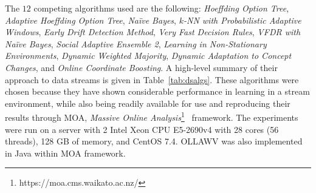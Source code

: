 \documentclass[reqno]{vcuthesis}
\numberwithin{equation}{chapter}
\begin{document}
The $12$ competing algorithms used are the following: \textit{Hoeffding Option Tree}, \textit{Adaptive Hoeffding Option Tree}, \textit{Na\"{i}ve Bayes}, \textit{$k$-NN with Probabilistic Adaptive Windows}, \textit{Early Drift Detection Method}, \textit{Very Fast Decision Rules}, \textit{VFDR with Na\"{i}ve Bayes}, \textit{Social Adaptive Ensemble 2}, \textit{Learning in Non-Stationary Environments}, \textit{Dynamic Weighted Majority}, \textit{Dynamic Adaptation to Concept Changes}, and \textit{Online Coordinate Boosting}. A high-level summary of their approach to data streams is given in Table~\ref{tab:dsalgs}. These algorithms were chosen because they have shown considerable performance in learning in a stream environment, while also being readily available for use and reproducing their results through MOA, \textit{Massive Online Analysis}\footnote{https://moa.cms.waikato.ac.nz/}~\cite{moacite} framework. The experiments were run on a server with 2 Intel Xeon CPU E5-2690v4 with 28 cores (56 threads), 128 GB of memory, and CentOS 7.4. OLLAWV was also implemented in Java within MOA framework. 
\end{document}
